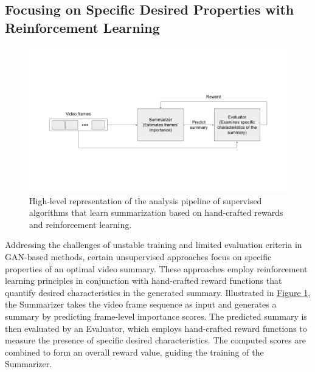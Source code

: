 \subsection{Focusing on Specific Desired Properties with Reinforcement Learning}
\label{subsec:rel-unsup-specific-properties}
\begin{figure}[ht]
    \centering
    \includegraphics[width=0.73\paperwidth]{content/related/figures/unsup-characteristics.png}
    \caption{High-level representation of the analysis pipeline of supervised algorithms that learn summarization based on hand-crafted rewards and reinforcement learning.}
    \label{figure:rel-unsup-properties}
  \end{figure}

Addressing the challenges of unstable training and limited evaluation criteria in GAN-based methods, certain unsupervised approaches focus on specific properties of an optimal video summary. These approaches employ reinforcement learning principles in conjunction with hand-crafted reward functions that quantify desired characteristics in the generated summary. Illustrated in \hyperref[figure:rel-unsup-properties]{Figure \ref{figure:rel-unsup-properties}}, the Summarizer takes the video frame sequence as input and generates a summary by predicting frame-level importance scores. The predicted summary is then evaluated by an Evaluator, which employs hand-crafted reward functions to measure the presence of specific desired characteristics. The computed scores are combined to form an overall reward value, guiding the training of the Summarizer.

